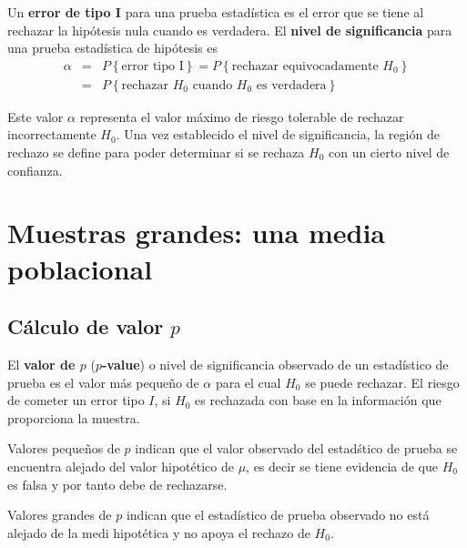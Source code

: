 \begin{Def}
Un \textbf{error de tipo I} para una prueba estad\'istica es el error que se tiene al rechazar la hip\'otesis nula cuando es verdadera. El \textbf{nivel de significancia} para una prueba estad\'istica de hip\'otesis es
\begin{eqnarray*}
\alpha&=&P\left\{\textrm{error tipo I}\right\}=P\left\{\textrm{rechazar equivocadamente }H_{0}\right\}\\
&=&P\left\{\textrm{rechazar }H_{0}\textrm{ cuando }H_{0}\textrm{ es verdadera}\right\}
\end{eqnarray*}

\end{Def}
Este valor $\alpha$ representa el valor m\'aximo de riesgo tolerable de rechazar incorrectamente $H_{0}$. Una vez establecido el nivel de significancia, la regi\'on de rechazo se define para poder determinar si se rechaza $H_{0}$ con un cierto nivel de confianza.



\section{Muestras grandes: una media poblacional}
\subsection{C\'alculo de valor $p$}





\begin{Def}
El \textbf{valor de $p$} (\textbf{$p$-value}) o nivel de significancia observado de un estad\'istico de prueba es el valor m\'as peque\~ no de $\alpha$ para el cual $H_{0}$ se puede rechazar. El riesgo de cometer un error tipo $I$, si $H_{0}$ es rechazada con base en la informaci\'on que proporciona la muestra.
\end{Def}

\begin{Note}
Valores peque\~ nos de $p$ indican 	que el valor observado del estad\'stico de prueba se encuentra alejado del valor hipot\'etico de $\mu$, es decir se tiene evidencia de que $H_{0}$ es falsa y por tanto debe de rechazarse.
\end{Note}

\begin{Note}
Valores grandes de $p$ indican que el estad\'istico de prueba observado no est\'a alejado de la medi hipot\'etica y no apoya el rechazo de $H_{0}$.
\end{Note}







